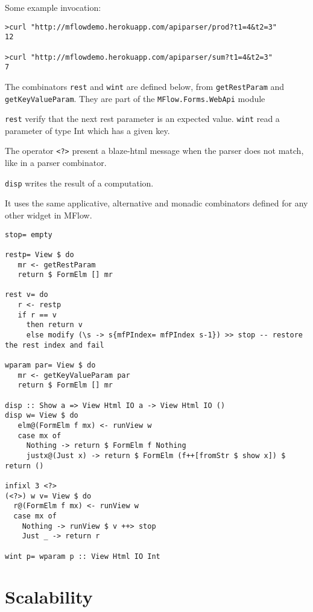 \documentclass{tmr}
\begin{document}
Some example invocation:
{\tt

\begin{verbatim}
>curl "http://mflowdemo.herokuapp.com/apiparser/prod?t1=4&t2=3"
12

>curl "http://mflowdemo.herokuapp.com/apiparser/sum?t1=4&t2=3"
7
\end{verbatim}
 
}
The combinators {\tt rest} and {\tt wint} are defined below, from {\tt getRestParam} and {\tt getKeyValueParam}. They are part of the {\tt MFlow.Forms.WebApi} module

{\tt rest} verify that the next rest parameter is an expected value. {\tt wint} read a parameter of type Int which has a given key. 

The operator {\tt <?>} present a blaze-html message when the parser does not match, like in a parser combinator.

{\tt disp} writes the result of a computation.

It uses the same applicative, alternative and monadic combinators defined for any other widget in MFlow.

{\tt

\begin{verbatim}
stop= empty

restp= View $ do
   mr <- getRestParam
   return $ FormElm [] mr

rest v= do
   r <- restp
   if r == v
     then return v 
     else modify (\s -> s{mfPIndex= mfPIndex s-1}) >> stop -- restore the rest index and fail

wparam par= View $ do
   mr <- getKeyValueParam par
   return $ FormElm [] mr

disp :: Show a => View Html IO a -> View Html IO ()
disp w= View $ do
   elm@(FormElm f mx) <- runView w
   case mx of
     Nothing -> return $ FormElm f Nothing
     justx@(Just x) -> return $ FormElm (f++[fromStr $ show x]) $ return ()

infixl 3 <?>
(<?>) w v= View $ do
  r@(FormElm f mx) <- runView w
  case mx of
    Nothing -> runView $ v ++> stop
    Just _ -> return r

wint p= wparam p :: View Html IO Int

\end{verbatim}
 
 

}
\section{Scalability} 
 
\end{document}
